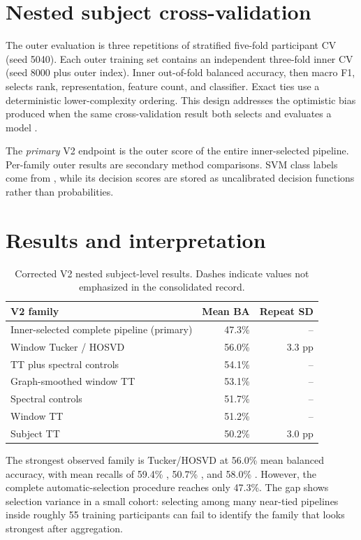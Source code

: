 \section{Nested subject cross-validation}

The outer evaluation is three repetitions of stratified five-fold participant
CV (seed 5040). Each outer training set contains an independent three-fold inner
CV (seed 8000 plus outer index). Inner out-of-fold balanced accuracy, then macro
F1, selects rank, representation, feature count, and classifier. Exact ties use
a deterministic lower-complexity ordering. This design addresses the optimistic
bias produced when the same cross-validation result both selects and evaluates a
model \citep{varma2006nested}.



The \emph{primary} V2 endpoint is the outer score of the entire inner-selected
pipeline. Per-family outer results are secondary method comparisons. SVM class
labels come from , while its decision scores are stored as
uncalibrated decision functions rather than probabilities.

\section{Results and interpretation}

\begin{table}[htbp]
\centering
\begin{tabular}{lrr}
\toprule
\textbf{V2 family} & \textbf{Mean BA} & \textbf{Repeat SD}\\
\midrule
Inner-selected complete pipeline (primary) & 47.3\% & --\\
Window Tucker / HOSVD & 56.0\% & 3.3 pp\\
TT plus spectral controls & 54.1\% & --\\
Graph-smoothed window TT & 53.1\% & --\\
Spectral controls & 51.7\% & --\\
Window TT & 51.2\% & --\\
Subject TT & 50.2\% & 3.0 pp\\
\bottomrule
\end{tabular}
\caption{Corrected V2 nested subject-level results. Dashes indicate values not emphasized in the consolidated record.}
\label{tab:v2-results}
\end{table}

The strongest observed family is Tucker/HOSVD at 56.0\% mean balanced accuracy,
with mean recalls of 59.4\% \AD{}, 50.7\% \FTD{}, and 58.0\% \CN{}. However,
the complete automatic-selection procedure reaches only 47.3\%. The gap shows
selection variance in a small cohort: selecting among many near-tied pipelines
inside roughly 55 training participants can fail to identify the family that
looks strongest after aggregation.


